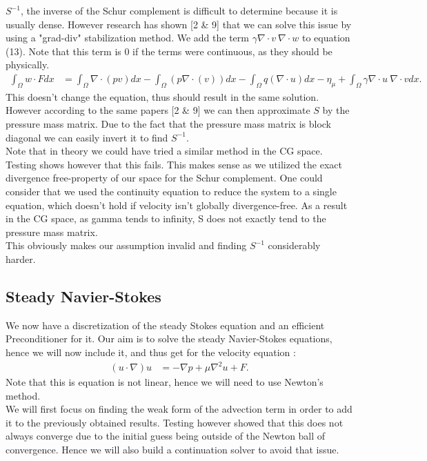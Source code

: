 \documentclass[11pt,twoside,a4paper]{article}
\begin{document}
 $S^{-1}$, the inverse of the Schur complement is difficult to determine because it is usually dense. However research has shown [2 \& 9] that we can solve this issue by using a "grad-div" stabilization method. We add the term $\gamma \nabla \cdot v \: \nabla \cdot w$ to equation (13). Note that this term is 0 if the terms were continuous, as they should be physically.
\begin{align}
\int_\Omega w \cdot F dx &= \int_\Omega \nabla \cdot (p v) dx - \int_\Omega ( p \nabla \cdot (v)) dx - \int_\Omega q (\nabla \cdot u) dx  - \eta_\mu + \int_\Omega \gamma \nabla \cdot u \: \nabla \cdot v dx .
\end{align}
This doesn't change the equation, thus should result in the same solution. However according to the same papers [2 \& 9] we can then approximate $S$ by the pressure mass matrix. Due to the fact that the pressure mass matrix is block diagonal we can easily invert it to find $S^{-1}$.
\\
Note that in theory we could have tried a similar method in the CG space.
Testing shows however that this fails.
This makes sense as we utilized the exact divergence free-property of our space for the Schur complement. One could consider that we used the continuity equation to reduce the system to a single equation, which doesn't hold if velocity isn't globally divergence-free.
As a result in the CG space, as gamma tends to infinity, S does not exactly tend to the pressure mass matrix.\\
This obviously makes our assumption invalid and finding $S^{-1}$ considerably harder.

\subsection{Steady Navier-Stokes}
We now have a discretization of the steady Stokes equation and an efficient Preconditioner for it.
Our aim is to solve the steady Navier-Stokes equations, hence we will now include it, and thus get for the velocity equation :
\begin{align*}
(u \cdot \nabla) u &= -\nabla p + \mu \nabla^2 u + F .
\end{align*}
Note that this is equation is not linear, hence we will need to use Newton's method.\\
We will first focus on finding the weak form of the advection term in order to add it to the previously obtained results. Testing however showed that this does not always converge due to the initial guess being outside of the Newton ball of convergence. Hence we will also build a continuation solver to avoid that issue.
\end{document}
